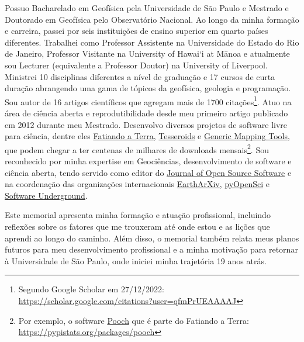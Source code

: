 \documentclass[10pt,a4paper,oneside]{book}
\newcommand{\UHM}{University of Hawai`i at M\={a}noa}
\newcommand{\UERJ}{Universidade do Estado do Rio de Janeiro}
\begin{document}
Possuo Bacharelado em Geofísica pela Universidade de São Paulo e Mestrado
e Doutorado em Geofísica pelo Observatório Nacional.
Ao longo da minha formação e carreira, passei por seis instituições de ensino
superior em quarto países diferentes.
Trabalhei como Professor Assistente na \UERJ{},
Professor Visitante na \UHM{} e atualmente sou Lecturer (equivalente a
Professor Doutor) na University of Liverpool.
Ministrei 10 disciplinas diferentes a nível de graduação e 17 cursos de curta
duração abrangendo uma gama de tópicos da geofísica, geologia e programação.
Sou autor de 16 artigos científicos que agregam mais de 1700
citações\footnote{Segundo Google Scholar em 27/12/2022: \url{https://scholar.google.com/citations?user=qfmPrUEAAAAJ}}.
Atuo na área de ciência aberta e reprodutibilidade desde meu primeiro artigo
publicado em 2012 durante meu Mestrado.
Desenvolvo diversos projetos de software livre para ciência, dentre eles
\href{https://www.fatiando.org/}{Fatiando a Terra},
\href{https://tesseroids.leouieda.com}{Tesseroids}
e
\href{https://www.generic-mapping-tools.org/}{Generic Mapping Tools},
que podem chegar a ter centenas de milhares de downloads
mensais\footnote{Por exemplo, o software
\href{https://github.com/fatiando/pooch}{Pooch} que é parte do Fatiando a
Terra: \url{https://pypistats.org/packages/pooch}}.
Sou reconhecido por minha expertise em Geociências, desenvolvimento de software
e ciência aberta, tendo servido como editor do
\href{https://joss.theoj.org/}{Journal of Open Source Software} e na
coordenação das organizações internacionais
\href{https://eartharxiv.org/}{EarthArXiv},
\href{https://www.pyopensci.org/}{pyOpenSci}
e \href{https://softwareunderground.org}{Software Underground}.

Este memorial apresenta minha formação e atuação profissional, incluindo
reflexões sobre os fatores que me trouxeram até onde estou e as lições que
aprendi ao longo do caminho.
Além disso, o memorial também relata meus planos futuros para meu
desenvolvimento profissional e a minha motivação para retornar à Universidade
de São Paulo, onde iniciei minha trajetória 19 anos atrás.
\end{document}
